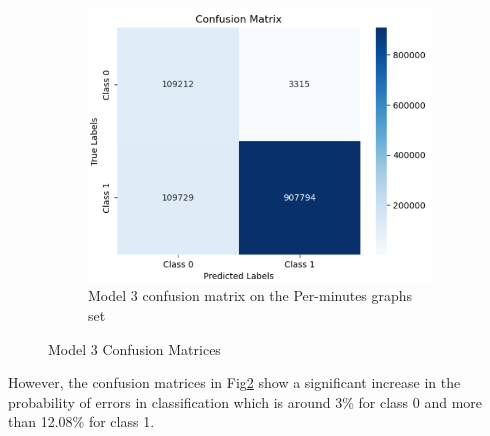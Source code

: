 \begin{figure}[H]
\begin{subfigure}{0.49\textwidth}
    \end{subfigure}
    \begin{subfigure}{0.49\textwidth}
        \centering
        \includegraphics[width=\linewidth]{figures/ev/3_cm3.png}
        \caption{Model 3 confusion matrix on the Per-minutes graphs set}
    \label{fig:3_cm3}
    \end{subfigure}
    \captionsetup{font=large}
    \caption{Model 3 Confusion Matrices}
    \label{fig:3_cm}
\end{figure}
However, the confusion matrices in Fig\ref{fig:3_cm} show a significant increase in the probability of errors in classification which is around 3\%  for class 0  and more than 12.08\% for class 1.
